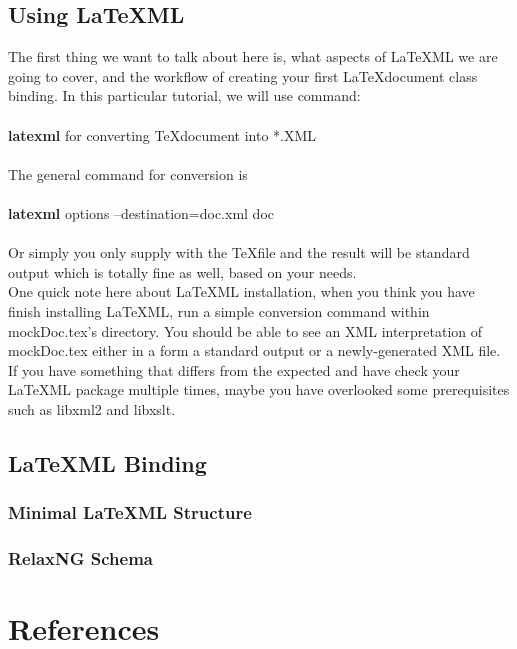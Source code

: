 \documentclass{book}
\begin{document}
\section{Using LaTeXML}
The first thing we want to talk about here is, what aspects of \LaTeX ML we are going to cover, and the 
workflow of creating your first \LaTeX document class binding. In this particular tutorial, we will use command:\\ \\
\textbf{latexml} for converting \TeX document into *.XML \\ \\
The general command for conversion is \\ \\
\textbf{latexml} {options} --destination=doc.xml doc \\ \\
Or simply you only supply with the \TeX file and the result will be standard output which is totally fine as well,
based on your needs. \\
One quick note here about \LaTeX ML installation, when you think you have finish installing \LaTeX ML, run
a simple conversion command within mockDoc.tex's directory. You should be able to see an XML interpretation of
mockDoc.tex either in a form a standard output or a newly-generated XML file. If you have something that differs from
the expected and have check your \LaTeX ML package multiple times, maybe you have overlooked some prerequisites such as 
libxml2 and libxslt. 
\section{LaTeXML Binding}
\subsection{Minimal LaTeXML Structure}
\subsection{RelaxNG Schema}
\chapter{References}
\end{document}
